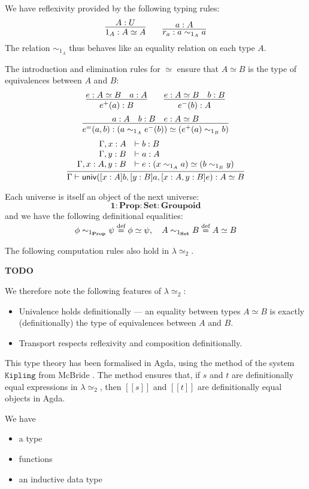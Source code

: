 \documentclass{easychair}
\newcommand{\Prop}{\ensuremath{\mathbf{Prop}}}
\newcommand{\Set}{\ensuremath{\mathbf{Set}}}
\newcommand{\Groupoid}{\ensuremath{\mathbf{Groupoid}}}
\newcommand{\LEtwo}{\ensuremath{\lambda \! \simeq_2}}
\newcommand{\eqdef}{\mathrel{\smash{\stackrel{\text{def}}{=}}}}
\newcommand{\brackets}[1]{\ensuremath{[ \! [ {#1} ] \! ]}}
\begin{document}
We have reflexivity provided by the following typing rules:
\[ \infer{1_A : A \simeq A}{A : U} \qquad \infer{r_a : a \sim_{1_A} a}{a : A} \]
The relation $\sim_{1_A}$ thus behaves like an equality relation on each type $A$.

The introduction and elimination rules for $\simeq$ ensure that $A \simeq B$ is the type of equivalences between $A$ and $B$:
\[ \infer{e^+(a) : B}{e : A \simeq B \quad a : A} \qquad \infer{e^-(b) : A}{e : A \simeq B \quad b : B} \]
\[ \infer{e^=(a,b) : (a \sim_{1_A} e^-(b)) \simeq (e^+(a) \sim_{1_B} b)}{a : A \quad b : B \quad e : A \simeq B} \]
\[ \infer{\Gamma \vdash \mathsf{univ}([x : A] b, [y : B] a, [x : A, y : B]e) : A \simeq B}{\begin{array}{rl}
\Gamma, x : A & \vdash b : B \\
\Gamma, y : B & \vdash a : A \\
\Gamma, x : A, y : B & \vdash e : (x \sim_{1_A} a) \simeq (b \sim_{1_B} y)
\end{array}} \]

Each universe is itself an object of the next universe:
\[ \mathbf{1} : \Prop : \Set : \Groupoid \]
and we have the following definitional equalities:
\[ \phi \sim_{1_\Prop} \psi \eqdef \phi \simeq \psi, \quad
A \sim_{1_\Set} B \eqdef A \simeq B \]

The following computation rules also hold in $\LEtwo$.

\textbf{TODO}

We therefore note the following features of $\LEtwo$:
\begin{itemize}
\item
Univalence holds definitionally --- an equality between types $A \simeq B$ is exactly (definitionally) the type of equivalences between $A$ and $B$.
\item
Transport respects reflexivity and composition definitionally.
\end{itemize}

This type theory has been formalised in Agda, using the method of the system $\mathtt{Kipling}$ from McBride \cite{McBridea}.  The method ensures that, if $s$ and $t$ are definitionally equal expressions in $\lambda \simeq_2$, then $\brackets{s}$ and $\brackets{t}$ are definitionally equal objects in Agda.

We have
\begin{itemize}
\item
a type 
\item
functions
\item
an inductive data type
\end{itemize}
\end{document}
